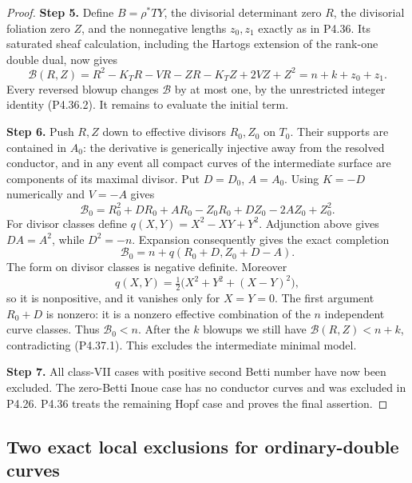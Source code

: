 \begin{proof}
\noindent\textbf{Step 5.} Define $B=\rho^*TY$, the divisorial determinant zero
$R$, the divisorial foliation zero $Z$, and the
nonnegative lengths $z_0,z_1$ exactly as in P4.36.
Its saturated sheaf calculation, including the
Hartogs extension of the rank-one double dual,
now gives
\[
 \mathcal B(R,Z)
 =R^2-K_TR-VR-ZR-K_TZ+2VZ+Z^2
 =n+k+z_0+z_1.                                  \tag{P4.37.1}
\]
Every reversed blowup changes $\mathcal B$ by at
most one, by the unrestricted integer identity
(P4.36.2). It remains to evaluate the initial term.

\noindent\textbf{Step 6.} Push $R,Z$ down to effective divisors $R_0,Z_0$
on $T_0$. Their supports are contained in $A_0$:
the derivative is generically injective away from
the resolved conductor, and in any event all
compact curves of the intermediate surface are
components of its maximal divisor. Put $D=D_0$,
$A=A_0$. Using $K=-D$ numerically and $V=-A$ gives
\[
 \mathcal B_0
 =R_0^2+DR_0+AR_0-Z_0R_0+DZ_0-2AZ_0+Z_0^2.
\]
For divisor classes define
$q(X,Y)=X^2-XY+Y^2$.
Adjunction above gives $DA=A^2$, while $D^2=-n$.
Expansion consequently gives the exact completion
\[
 \mathcal B_0
       =n+q(R_0+D,Z_0+D-A).                     \tag{P4.37.2}
\]
The form on divisor classes is negative definite.
Moreover
\[
 q(X,Y)=\tfrac12\bigl(X^2+Y^2+(X-Y)^2\bigr),
\]
so it is nonpositive, and it vanishes only for
$X=Y=0$. The first argument $R_0+D$ is nonzero:
it is a nonzero effective combination of the
$n$ independent curve classes. Thus
$\mathcal B_0<n$.
After the $k$ blowups we still have
$\mathcal B(R,Z)<n+k$, contradicting (P4.37.1).
This excludes the intermediate minimal model.

\noindent\textbf{Step 7.} All class-VII cases with positive second Betti
number have now been excluded. The zero-Betti
Inoue case has no conductor curves and was
excluded in P4.26. P4.36 treats the remaining
Hopf case and proves the final assertion.
\end{proof}


\subsection{Two exact local exclusions for ordinary-double curves}

